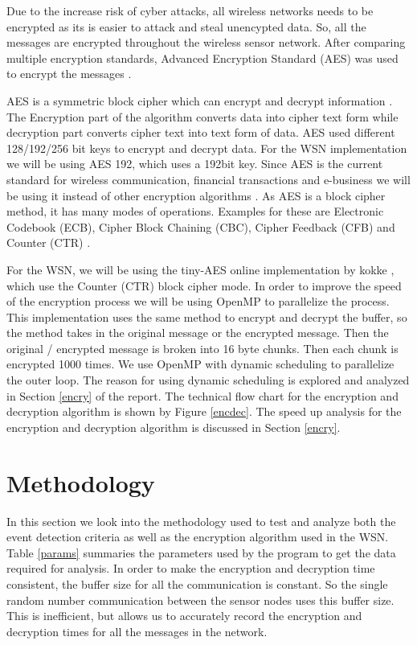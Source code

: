 \documentclass[conference]{IEEEtran}
\begin{document}
	Due to the increase risk of cyber attacks, all wireless networks needs to be encrypted as its is easier to attack and steal unencypted data. So, all the messages are encrypted throughout the wireless sensor network. After comparing multiple encryption standards, Advanced Encryption Standard (AES) was used to encrypt the messages \cite{daemen1999aes}.
	
	AES is a symmetric block cipher which can encrypt and decrypt information \cite{rouse_cobb}. The Encryption part of the algorithm converts data into cipher text form while decryption part converts cipher text into text form of data.  AES used different 128/192/256 bit keys to encrypt and decrypt data. For the WSN implementation we will be using AES 192, which uses a 192bit key. Since AES is the current standard for wireless communication, financial transactions and e-business we will be using it instead of other encryption algorithms \cite{rfwirelessworld}. As AES is a block cipher method, it has many modes of operations. Examples for these are Electronic Codebook (ECB), Cipher Block Chaining (CBC), Cipher Feedback (CFB) and Counter (CTR) \cite{meghna_2019}.
	
	For the WSN, we will be using the tiny-AES online implementation by kokke \cite{kokke_2019}, which use the Counter (CTR) block cipher mode. In order to improve the speed of the encryption process we will be using OpenMP \cite{openmp_2018} to parallelize the process. This implementation uses the same method to encrypt and decrypt the buffer, so the method takes in the original message or the encrypted message. Then the original / encrypted message is broken into 16 byte chunks. Then each chunk is encrypted 1000 times. We use OpenMP with dynamic scheduling to parallelize the outer loop. The reason for using dynamic scheduling is explored and analyzed in Section \ref{encry} of the report. The technical flow chart for the encryption and decryption algorithm is shown by Figure \ref{encdec}. The speed up analysis for the encryption and decryption algorithm is discussed in Section \ref{encry}.
	
	\section{Methodology}\label{method}

	In this section we look into the methodology used to test and analyze both the event detection criteria as well as the encryption algorithm used in the WSN. Table \ref{params} summaries the parameters used by the program to get the data required for analysis. In order to make the encryption and decryption time consistent, the buffer size for all the communication is constant. So the single random number communication between the sensor nodes uses this buffer size. This is inefficient, but allows us to accurately record the encryption and decryption times for all the messages in the network. 
	
\end{document}
